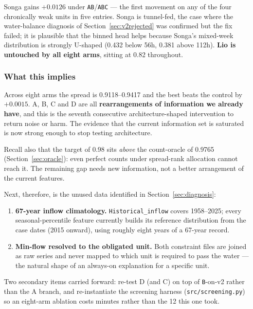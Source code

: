 Songa gains $+0.0126$ under \texttt{AB}/\texttt{ABC} --- the first movement on any of the four
chronically weak units in five entries. Songa is tunnel-fed, the case where the water-balance
diagnosis of Section~\ref{sec:v2rejected} was confirmed but the fix failed; it is plausible that the
binned head helps because Songa's mixed-week distribution is strongly U-shaped (0.432 below 56h,
0.381 above 112h). \textbf{Lio is untouched by all eight arms}, sitting at 0.82 throughout.

\subsubsection*{What this implies}

\begin{finding}
Across eight arms the spread is 0.9118--0.9417 and the best beats the control by $+0.0015$. A, B,
C and D are all \textbf{rearrangements of information we already have}, and this is the seventh
consecutive architecture-shaped intervention to return noise or harm. The evidence that the
current information set is saturated is now strong enough to stop testing architecture.
\end{finding}

Recall also that the target of 0.98 sits \emph{above} the count-oracle of 0.9765
(Section~\ref{sec:oracle}): even perfect counts under spread-rank allocation cannot reach it. The
remaining gap needs new information, not a better arrangement of the current features.

Next, therefore, is the unused data identified in Section~\ref{sec:diagnosis}:
\begin{enumerate}
  \item \textbf{67-year inflow climatology.} \texttt{Historical\_inflow} covers 1958--2025;
        every seasonal-percentile feature currently builds its reference distribution from the
        case dates (2015 onward), using roughly eight years of a 67-year record.
  \item \textbf{Min-flow resolved to the obligated unit.} Both constraint files are joined as
        raw series and never mapped to which unit is required to pass the water --- the natural
        shape of an always-on explanation for a specific unit.
\end{enumerate}

Two secondary items carried forward: re-test D (and C) on top of \texttt{B}-on-v2 rather than the
A branch, and re-instantiate the screening harness (\texttt{src/screening.py}) so an eight-arm
ablation costs minutes rather than the 12 this one took.

